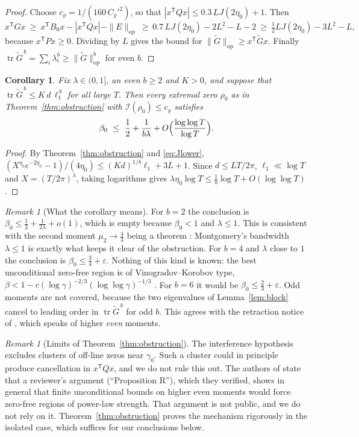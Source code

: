 \documentclass[reqno,11pt]{amsart}
\numberwithin{equation}{section}
\theoremstyle{plain}
\newtheorem{corollary}[theorem]{Corollary}
\theoremstyle{remark}
\newtheorem{remark}[theorem]{Remark}
\newcommand{\eps}{\varepsilon}
\DeclareMathOperator{\tr}{tr}
\begin{document}
\begin{proof}
Choose $c_\varrho=1/(160\,C_\varrho'^2)$, so that
$|x^{\mathsf T}Qx|\le0.3\,LJ(2\eta_0)+1$. Then
\[
x^{\mathsf T}Gx\ \ge\ x^{\mathsf T}B_0x-|x^{\mathsf T}Qx|-\|E\|_{\mathrm{op}}
\ \ge\ 0.7\,LJ(2\eta_0)-2L^2-L-2\ \ge\ \tfrac12LJ(2\eta_0)-3L^2-L,
\]
because $x^{\mathsf T}Px\ge0$. Dividing by $L$ gives the bound for
$\|\widetilde G\|_{\mathrm{op}}\ge x^{\mathsf T}\widetilde Gx$. Finally
$\tr\widetilde G^{\,b}=\sum_i\lambda_i^b\ge\|\widetilde G\|_{\mathrm{op}}^b$
for even $b$.
\end{proof}

\begin{corollary}\label{cor:zerofree}
Fix $\lambda\in(0,1]$, an even $b\ge2$ and $K>0$, and suppose that
$\tr\widetilde G^{\,b}\le K\,d\,\ell_1^{\,b}$ for all large $T$. Then every
extremal zero $\rho_0$ as in Theorem~\ref{thm:obstruction} with
$\mathcal I(\rho_0)\le c_\varrho$ satisfies
\[
\beta_0\ \le\ \frac12+\frac1{b\lambda}+O\Bigl(\frac{\log\log T}{\log T}\Bigr).
\]
\end{corollary}

\begin{proof}
By Theorem~\ref{thm:obstruction} and \eqref{eq:Jlower},
$(X^{\eta_0}e^{-2\eta_0}-1)/(4\eta_0)\le(Kd)^{1/b}\ell_1+3L+1$. Since
$d\le LT/2\pi$, $\ell_1\ll\log T$ and $X=(T/2\pi)^{\lambda}$, taking logarithms
gives $\lambda\eta_0\log T\le\frac1b\log T+O(\log\log T)$.
\end{proof}

\begin{remark}[What the corollary means]\label{rem:meaning}
For $b=2$ the conclusion is $\beta_0\le\frac12+\frac1{2\lambda}+o(1)$, which is
empty because $\beta_0<1$ and $\lambda\le1$. This is consistent with the second
moment $\mu_2\to\frac43$ being a theorem \cite{C26,BGST24}: Montgomery's
bandwidth $\lambda\le1$ is exactly what keeps it clear of the obstruction.
For $b=4$ and $\lambda$ close to $1$ the conclusion is
$\beta_0\le\frac34+\eps$. Nothing of this kind is known: the best
unconditional zero-free region is of Vinogradov--Korobov type,
$\beta<1-c(\log\gamma)^{-2/3}(\log\log\gamma)^{-1/3}$ \cite{For02}. For $b=6$
it would be $\beta_0\le\frac23+\eps$. Odd moments are not covered, because the
two eigenvalues of Lemma~\ref{lem:block} cancel to leading order in
$\tr\widetilde G^{\,b}$ for odd $b$. This agrees with the retraction notice
of \cite{YY26b}, which speaks of higher \emph{even} moments.
\end{remark}

\begin{remark}[Limits of Theorem~\ref{thm:obstruction}]
The interference hypothesis excludes clusters of off-line zeros near
$\gamma_0$. Such a cluster could in principle produce cancellation in
$x^{\mathsf T}Qx$, and we do not rule this out. The authors of \cite{YY26b}
state that a reviewer's argument (``Proposition R''), which they verified,
shows in general that finite unconditional bounds on higher even moments would
force zero-free regions of power-law strength. That argument is not public,
and we do not rely on it. Theorem~\ref{thm:obstruction} proves the
mechanism rigorously in the isolated case, which suffices for our conclusions
below.
\end{remark}
\end{document}
